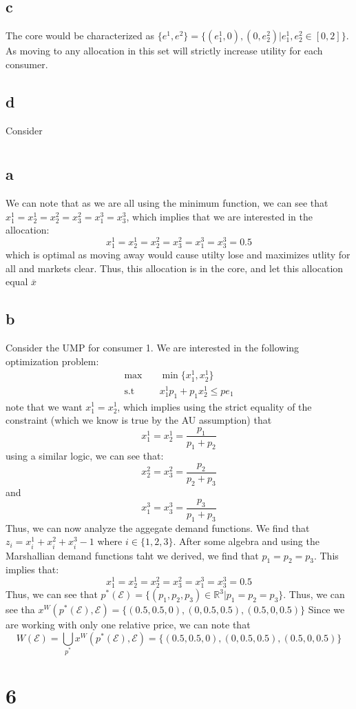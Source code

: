 \documentclass[11pt]{article}
\newcommand{\R}{\mathbb{R}}
\newcommand{\st}{\text{s.t}}
\begin{document}
\subsection*{c}
The core would be characterized as $\{e^1, e^2\} = \{(e_1^1, 0), (0, e_2^2) | e_1^1, e_2^2 \in [0,2]\}$. As moving to any allocation in this set will strictly increase utility for each consumer. 
\subsection*{d}
Consider 
\section{}
\subsection*{a}
We can note that as we are all using the minimum function, we can see that $x_1^1 = x_2^1 = x_2^2 = x_3^2 = x_1^3 = x_3^3$, which implies that we are interested in the allocation:
\[
    x_1^1 = x_2^1 = x_2^2 = x_3^2 = x_1^3 = x_3^3 = 0.5
\]
which is optimal as moving away would cause utilty lose and maximizes utlity for all and markets clear. Thus, this allocation is in the core, and let this allocation equal $\overline{x}$
\subsection*{b}
Consider the UMP for consumer 1. We are interested in the following optimization problem:
\begin{align*}
    \max & \quad \min\{x_1^1, x_2^1\}\\
    \st & \quad x_1^1 p_1 + p_1x_2^1 \leq p e_1
\end{align*}
note that we want $x_1^1 = x_2^1$, which implies using the strict equality of the constraint (which we know is true by the AU assumption) that 
\[
x_1^1 = x_2^1 = \frac{p_1}{p_1 + p_2}
\]
using a similar logic, we can see that:
\[
x_2^2 = x_3^2 = \frac{p_2}{p_2+p_3}
\]
and
\[
x_1^3 = x_3^3 = \frac{p_3}{p_1+p_3}
\]
Thus, we can now analyze the aggegate demand functions. 
We find that $z_i = x_i^1 + x_i^2 + x_i^3 - 1$ where $i \in \{1,2,3\}$. After some algebra and using the Marshallian demand functions taht we derived, we find that $p_1 = p_2 = p_3$. This implies that:
\[
    x_1^1 = x_2^1 = x_2^2 = x_3^2 = x_1^3 = x_3^3 = 0.5
\]
Thus, we can see that $p^*(\mathcal{E}) = \{(p_1, p_2, p_3) \in \R^3 | p_1 = p_2 = p_3\}$. Thus, we can see tha $x^W(p^*(\mathcal{E}), \mathcal{E}) = \{ (0.5,0.5,0), (0, 0.5, 0.5), (0.5, 0, 0.5)\}$ Since we are working with only one relative price, we can note that 
\[
    W(\mathcal{E}) = \bigcup_{p^*} x^W(p^*(\mathcal{E}), \mathcal{E}) = \{ (0.5,0.5,0), (0, 0.5, 0.5), (0.5, 0, 0.5)\}
\]
\section*{6}
\end{document}
